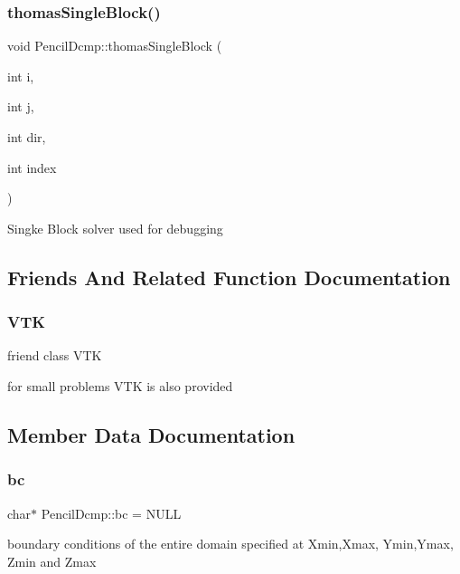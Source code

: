 \subsubsection{\texorpdfstring{thomas\+Single\+Block()}{thomasSingleBlock()}}
{\footnotesize\ttfamily void Pencil\+Dcmp\+::thomas\+Single\+Block (\begin{DoxyParamCaption}\item[{int}]{i,  }\item[{int}]{j,  }\item[{int}]{dir,  }\item[{int}]{index }\end{DoxyParamCaption})}

Singke Block solver used for debugging 

\subsection{Friends And Related Function Documentation}
\mbox{\label{classPencilDcmp_abf858174faa5fb6573824cbcbddf7924}} 
\subsubsection{\texorpdfstring{V\+TK}{VTK}}
{\footnotesize\ttfamily friend class V\+TK\hspace{0.3cm}{\ttfamily [friend]}}

for small problems V\+TK is also provided 

\subsection{Member Data Documentation}
\mbox{\label{classPencilDcmp_a8b5e6078c5689aeb6d5f79ae6c384260}} 
\subsubsection{\texorpdfstring{bc}{bc}}
{\footnotesize\ttfamily char$\ast$ Pencil\+Dcmp\+::bc = N\+U\+LL\hspace{0.3cm}{\ttfamily [protected]}}

boundary conditions of the entire domain specified at Xmin,Xmax, Ymin,Ymax, Zmin and Zmax \mbox{\label{classPencilDcmp_a44102096e8239b752fe1d39f3d8fd203}} 
